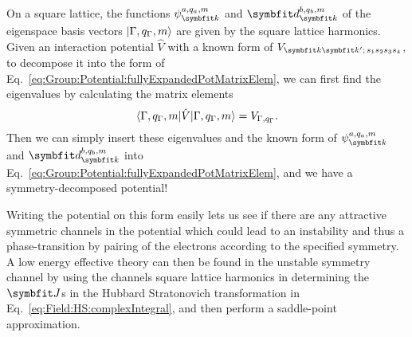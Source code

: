 On a square lattice, the functions $\psi_\v{k}^{a,q_a,m}$ and $\v{d}_\v{k}^{b,q_b,m}$ of the eigenspace basis vectors $\lvert \Gamma,q_\Gamma,m \rangle$ are given by
the square lattice harmonics. Given an interaction potential $\hat{V}$ with a known form of $V_{\v{k}\v{k}';\,s_1s_2s_3s_4}$, to decompose it into the form
of Eq.~\eqref{eq:Group:Potential:fullyExpandedPotMatrixElem}, we can first find the eigenvalues by calculating the matrix elements 
\begin{equation}
    \langle \Gamma, q_\Gamma,m \rvert\hat{V}\lvert \Gamma, q_\Gamma,m \rangle = V_{\Gamma,q_\Gamma}.
    \label{eq:Group:Potential:matrixElements}
\end{equation}
Then we can simply insert these eigenvalues and the known form of $\psi_\v{k}^{a,q_a,m}$
and $\v{d}_\v{k}^{b,q_b,m}$ into Eq.~\eqref{eq:Group:Potential:fullyExpandedPotMatrixElem}, and we have a symmetry-decomposed potential!

Writing the potential on this form easily lets us see if there are any attractive symmetric channels in the potential which could lead to an instability and thus a
phase-transition by pairing of the electrons according to the specified symmetry. A low energy effective theory can then be found in the unstable symmetry
channel by using the channels square lattice harmonics in determining the $\v{J}$s in the Hubbard Stratonovich transformation in Eq.~\eqref{eq:Field:HS:complexIntegral}, and then
perform a saddle-point approximation.
